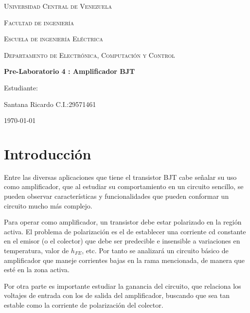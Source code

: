 \documentclass[10pt, a4paper]{article}
\begin{document}
    \begin{titlepage}
        \centering
        {\scshape\Large Universidad Central de Venezuela \par}
        {\scshape\Large Facultad de ingeniería \par}
        {\scshape\Large Escuela de ingeniería Eléctrica \par}
        {\scshape\Large Departamento de Electrónica, Computación y Control \par}

        \vspace{6cm}
        {\Large\bfseries Pre-Laboratorio 4 : Amplificador BJT\par}
        \vspace{5cm}

        \vfill
        \begin{flushright}
            Estudiante:\par
            Santana Ricardo C.I.:29571461 \par
            \vspace{1cm}  
        \end{flushright}
        \vfill
        {\large \today \par}
    \end{titlepage}

    \section{Introducción}

    Entre las diversas aplicaciones que tiene el transistor BJT cabe señalar su uso como amplificador, que al estudiar su comportamiento en un circuito sencillo, se pueden observar características y funcionalidades que pueden conformar un circuito mucho más complejo.
    
    Para operar como amplificador, un transistor debe estar polarizado en la región activa. El problema de polarización es el de establecer una corriente cd constante en el emisor (o el colector) que debe ser predecible e insensible a variaciones en temperatura, valor de $h_{FE}$, etc. Por tanto se analizará un circuito básico de amplificador que maneje corrientes bajas en la rama mencionada, de manera que esté en la zona activa.

    Por otra parte es importante estudiar la ganancia del circuito, que relaciona los voltajes de entrada con los de salida del amplificador, buscando que sea tan estable como la corriente de polarización del colector.
    
\end{document}
